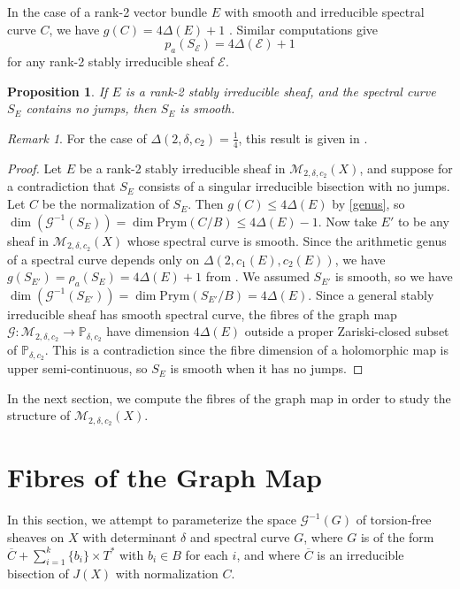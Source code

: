 \documentclass{article}[12pt]
\newtheorem{proposition}[theorem]{Proposition}
\theoremstyle{definition}
\theoremstyle{remark}
\newtheorem{remark}[theorem]{Remark}
\numberwithin{equation}{section}
\newcommand \mc{\mathcal}
\newcommand \mb{\mathbb}
\begin{document}
In the case of a rank-2 vector bundle $E$ with smooth and irreducible spectral curve $C$, we have $g(C)=4\Delta(E)+1$ \cite[Lemma 3.10]{BrMor}. Similar computations  give \begin{equation}p_a(S_\mc{E})=4\Delta(\mc{E})+1\label{genus}\end{equation}
for any rank-2 stably irreducible sheaf $\mc{E}$.
\begin{proposition}
	If $E$ is a rank-2 stably irreducible sheaf, and the spectral curve $S_E$ contains no jumps, then $S_E$ is smooth.
\end{proposition}
\begin{remark}
	For the case of $\Delta(2,\delta,c_2)=\frac{1}{4}$, this result is given in \cite[Corollary 4.4]{ApMorTom}.
\end{remark}
\begin{proof}
	Let $E$ be a rank-2 stably irreducible sheaf in $\mc{M}_{2,\delta,c_2}(X)$, and suppose for a contradiction that $S_E$ consists of a singular irreducible bisection with no jumps. Let $C$ be the normalization of $S_E$. Then $g(C)\leq 4\Delta(E)$ by \eqref{genus}, so $\dim(\mc{G}^{-1}(S_E))=\dim\text{Prym}(C/B)\leq4\Delta(E)-1$. Now take $E'$ to be any sheaf in $\mc{M}_{2,\delta,c_2}(X)$ whose spectral curve is smooth. Since the arithmetic genus of a spectral curve depends only on $\Delta(2,c_1(E),c_2(E))$, we have $g(S_{E'})=\rho_a(S_E)=4\Delta(E)+1$ from \cite[Lemma 3.10]{BrMor}. We assumed $S_{E'}$ is smooth, so we have $\dim(\mc{G}^{-1}(S_{E'}))=\dim\text{Prym}(S_{E'}/B)=4\Delta(E)$. Since a general stably irreducible sheaf has smooth spectral curve, the fibres of the graph map $\mc{G}:\mc{M}_{2,\delta,c_2}\to \mb{P}_{\delta,c_2}$ have dimension $4\Delta(E)$ outside a proper Zariski-closed subset of $\mb{P}_{\delta,c_2}$. This is a contradiction since the fibre dimension of a holomorphic map is upper semi-continuous, so $S_E$ is smooth when it has no jumps. 
\end{proof}



In the next section, we compute the fibres of the graph map in order to study the structure of $\mc{M}_{2,\delta,c_2}(X)$.


\section{Fibres of the Graph Map}\label{Fibres}
In this section, we attempt to parameterize the space $\mc{G}^{-1}(G)$ of torsion-free sheaves on $X$ with determinant $\delta$ and spectral curve $G$, where $G$ is of the form $\overline{C}+\sum\limits_{i=1}^k \{b_i\} \times T^*$ with $b_i \in B$ for each $i$, and where $\overline{C}$ is an irreducible bisection of $J(X)$ with normalization $C$. 
\end{document}
